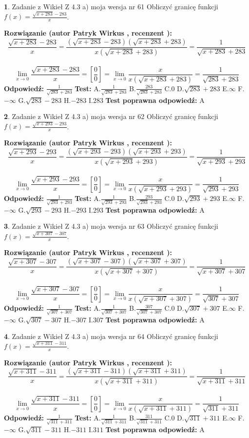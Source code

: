 \documentclass[12pt, a4paper]{article}
\theoremstyle{definition} %
\newtheorem{zad}{}
\newcommand{\zadStart}[1]{\begin{zad}#1\newline}
\newcommand{\zadStop}{\end{zad}}
\newcommand{\rozwStart}[2]{\noindent \textbf{Rozwiązanie (autor #1 , recenzent #2): }\newline}
\newcommand{\rozwStop}{\newline}
\newcommand{\odpStart}{\noindent \textbf{Odpowiedź:}\newline}
\newcommand{\odpStop}{\newline}
\newcommand{\testStart}{\noindent \textbf{Test:}\newline}
\newcommand{\testStop}{\newline}
\newcommand{\kluczStart}{\noindent \textbf{Test poprawna odpowiedź:}\newline}
\newcommand{\kluczStop}{\newline}
\begin{document}
\zadStart{Zadanie z Wikieł Z 4.3 a) moja wersja nr 61}
Obliczyć granicę funkcji $f(x)=\frac{\sqrt{x+283}-283}{x}$.
\zadStop
\rozwStart{Patryk Wirkus}{}
$$\frac{\sqrt{x+283}-283}{x}=\frac{(\sqrt{x+283}-283)(\sqrt{x+283}+283)}{x(\sqrt{x+283}+283)}=\frac{1}{\sqrt{x+283}+283}$$
\\
$$\lim\limits_{x\to0}\frac{\sqrt{x+283}-283}{x}=[\frac{0}{0}]=
\lim\limits_{x\to0}\frac{x}{x(\sqrt{x+283}+283)} = \frac{1}{\sqrt{283}+283}$$
\rozwStop
\odpStart
$\frac{1}{\sqrt{283}+283}$
\odpStop
\testStart
A.$\frac{1}{\sqrt{283}+283}$
B.$\frac{283}{\sqrt{283}+283}$
C.$0$
D.$\sqrt{283}+283$
E.$\infty$
F.$-\infty$
G.$\sqrt{283}-283$
H.$-283$
I.$283$
\testStop
\kluczStart
A
\kluczStop



\zadStart{Zadanie z Wikieł Z 4.3 a) moja wersja nr 62}
Obliczyć granicę funkcji $f(x)=\frac{\sqrt{x+293}-293}{x}$.
\zadStop
\rozwStart{Patryk Wirkus}{}
$$\frac{\sqrt{x+293}-293}{x}=\frac{(\sqrt{x+293}-293)(\sqrt{x+293}+293)}{x(\sqrt{x+293}+293)}=\frac{1}{\sqrt{x+293}+293}$$
\\
$$\lim\limits_{x\to0}\frac{\sqrt{x+293}-293}{x}=[\frac{0}{0}]=
\lim\limits_{x\to0}\frac{x}{x(\sqrt{x+293}+293)} = \frac{1}{\sqrt{293}+293}$$
\rozwStop
\odpStart
$\frac{1}{\sqrt{293}+293}$
\odpStop
\testStart
A.$\frac{1}{\sqrt{293}+293}$
B.$\frac{293}{\sqrt{293}+293}$
C.$0$
D.$\sqrt{293}+293$
E.$\infty$
F.$-\infty$
G.$\sqrt{293}-293$
H.$-293$
I.$293$
\testStop
\kluczStart
A
\kluczStop



\zadStart{Zadanie z Wikieł Z 4.3 a) moja wersja nr 63}
Obliczyć granicę funkcji $f(x)=\frac{\sqrt{x+307}-307}{x}$.
\zadStop
\rozwStart{Patryk Wirkus}{}
$$\frac{\sqrt{x+307}-307}{x}=\frac{(\sqrt{x+307}-307)(\sqrt{x+307}+307)}{x(\sqrt{x+307}+307)}=\frac{1}{\sqrt{x+307}+307}$$
\\
$$\lim\limits_{x\to0}\frac{\sqrt{x+307}-307}{x}=[\frac{0}{0}]=
\lim\limits_{x\to0}\frac{x}{x(\sqrt{x+307}+307)} = \frac{1}{\sqrt{307}+307}$$
\rozwStop
\odpStart
$\frac{1}{\sqrt{307}+307}$
\odpStop
\testStart
A.$\frac{1}{\sqrt{307}+307}$
B.$\frac{307}{\sqrt{307}+307}$
C.$0$
D.$\sqrt{307}+307$
E.$\infty$
F.$-\infty$
G.$\sqrt{307}-307$
H.$-307$
I.$307$
\testStop
\kluczStart
A
\kluczStop



\zadStart{Zadanie z Wikieł Z 4.3 a) moja wersja nr 64}
Obliczyć granicę funkcji $f(x)=\frac{\sqrt{x+311}-311}{x}$.
\zadStop
\rozwStart{Patryk Wirkus}{}
$$\frac{\sqrt{x+311}-311}{x}=\frac{(\sqrt{x+311}-311)(\sqrt{x+311}+311)}{x(\sqrt{x+311}+311)}=\frac{1}{\sqrt{x+311}+311}$$
\\
$$\lim\limits_{x\to0}\frac{\sqrt{x+311}-311}{x}=[\frac{0}{0}]=
\lim\limits_{x\to0}\frac{x}{x(\sqrt{x+311}+311)} = \frac{1}{\sqrt{311}+311}$$
\rozwStop
\odpStart
$\frac{1}{\sqrt{311}+311}$
\odpStop
\testStart
A.$\frac{1}{\sqrt{311}+311}$
B.$\frac{311}{\sqrt{311}+311}$
C.$0$
D.$\sqrt{311}+311$
E.$\infty$
F.$-\infty$
G.$\sqrt{311}-311$
H.$-311$
I.$311$
\testStop
\kluczStart
A
\kluczStop
\end{document}
